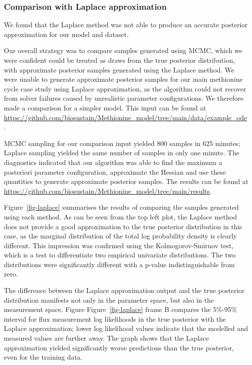 \documentclass[journal=asbcd6,manuscript=article,layout=traditional]{achemso}
\begin{document}
\hypertarget{sec-laplace}{%
\subsubsection{Comparison with Laplace
approximation}\label{sec-laplace}}

We found that the Laplace method was not able to produce an accurate
posterior approximation for our model and dataset.

Our overall strategy was to compare samples generated using MCMC, which
we were confident could be treated as draws from the true posterior
distribution, with approximate posterior samples generated using the
Laplace method. We were unable to generate approximate posterior samples
for our main methionine cycle case study using Laplace approximation, as
the algorithm could not recover from solver failures caused by
unrealistic parameter configurations. We therefore made a comparison for
a simpler model. This input can be found at
\url{https://github.com/biosustain/Methionine_model/tree/main/data/example_ode}.

MCMC sampling for our comparison input yielded 800 samples in 625
minutes; Laplace sampling yielded the same number of samples in only one
minute. The diagnostics indicated that our algorithm was able to find
the maximum a posteriori parameter configuration, approximate the
Hessian and use these quantities to generate approximate posterior
samples. The results can be found at
\url{https://github.com/biosustain/Methionine_model/tree/main/results}.

Figure~\ref{fig-laplace} summarises the results of comparing the samples
generated using each method. As can be seen from the top left plot, the
Laplace method does not provide a good approximation to the true
posterior distribution in this case, as the marginal distribution of the
total log probability density is clearly different. This impression was
confirmed using the Kolmogorov-Smirnov test, which is a test to
differentiate two empirical univariate distributions. The two
distributions were significantly different with a p-value
indistinguishable from zero.

The difference between the Laplace approximation output and the true
posterior distribution manifests not only in the parameter space, but
also in the measurement space. Figure Figure~\ref{fig-laplace} frame B
compares the 5\%-95\% interval for flux measurement log likelihoods in
the true posterior with the Laplace approximation; lower log likelihood
values indicate that the modelled and measured values are further away.
The graph shows that the Laplace approximation yielded significantly
worse predictions than the true posterior, even for the training data.
\end{document}
